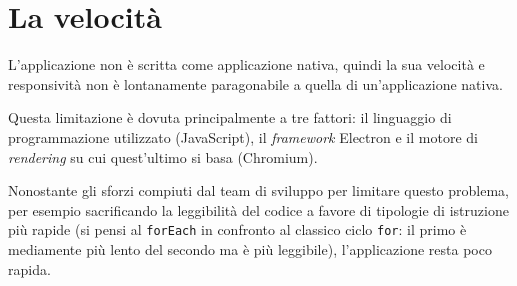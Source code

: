 \section{La velocità}
L'applicazione non è scritta come applicazione nativa, quindi la sua velocità e responsività non è lontanamente paragonabile a quella di un'applicazione nativa.

Questa limitazione è dovuta principalmente a tre fattori: il linguaggio di programmazione utilizzato (JavaScript), il \textit{framework} Electron e il motore di \textit{rendering} su cui quest'ultimo si basa (Chromium).

Nonostante gli sforzi compiuti dal team di sviluppo per limitare questo problema, per esempio sacrificando la leggibilità del codice a favore di tipologie di istruzione più rapide (si pensi al \lstinline|forEach| in confronto al classico ciclo \lstinline|for|: il primo è mediamente più lento del secondo ma è più leggibile), l'applicazione resta poco rapida.